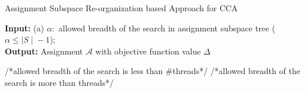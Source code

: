 \documentclass{article}
\begin{document}
\begin{algorithm}[h]
\caption{Assignment Subspace Re-organization based Approach for CCA}
\textbf{Input:} (a) $\alpha:$ allowed breadth of the search in assignment subspace tree ($\alpha \leq {\mid S \mid} − 1$);
\\
\textbf{Output:} Assignment $\mathcal{A}$ with objective function value $\Delta$
\begin{algorithmic}[1]
\ELSE 
{}
\IF {$\alpha \leq \tau$ } /*allowed breadth of the search is less than \#threads*/
\ELSE /*allowed breadth of the search is more than threads*/
\ENDIF
{}
\ENDIF
\ENDWHILE
\end{algorithmic}
\end{algorithm}



\end{document}
